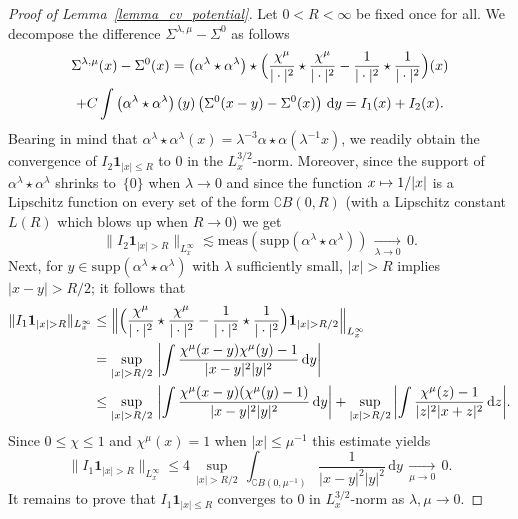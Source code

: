 \documentclass[10pt]{amsart}
\newcommand\mto{\mathchoice{\longmapsto}{\mapsto}{\mapsto}{\mapsto}}
\theoremstyle{definition}
\newenvironment{ProofOf}[1]{\begin{proof}[Proof of #1]}{\end{proof}}
\newcommand{\ud}{\, {\mathrm{d}}}
\begin{document}
\begin{ProofOf}{Lemma~\ref{lemma_cv_potential}}
Let $0<R<\infty$ be fixed once for all. We decompose the difference $\Sigma^{\lambda,\mu}-\Sigma^{0}$ as follows
\begin{multline*}
\Sigma^{\lambda,\mu}(x)-\Sigma^{0}(x)=\left(\alpha^{\lambda}\star\alpha^{\lambda}\right)\star\Bigl(\frac{\chi^{\mu}}{|\cdot|^{2}}\star\frac{\chi^{\mu}}{|\cdot|^{2}}-\frac{1}{|\cdot|^{2}}\star\frac{1}{|\cdot|^{2}}\Bigr)(x)\\
+C\int\left(\alpha^{\lambda}\star\alpha^{\lambda}\right)(y)\left(\Sigma^{0}(x-y)-\Sigma^{0}(x)\right)\ud y=I_{1}(x)+I_{2}(x).
\end{multline*}
Bearing in mind that $\alpha^{\lambda}\star\alpha^{\lambda}(x)=\lambda^{-3}\alpha\star\alpha(\lambda^{-1}x)$,
we readily obtain
the convergence of $I_{2}\mathbf{1}_{|x|\leq R}$ to 0 in the $L_{x}^{3/2}$-norm. Moreover, since the support of $\alpha^{\lambda}\star\alpha^{\lambda}$ shrinks to~$\{0\}$ when $\lambda\to 0$ and since the function $x\mto 1/|x|$ is a Lipschitz function on every set of the form $\complement B(0,R)$ (with a Lipschitz constant $L(R)$ which blows up when $R\to 0$) we get
\[
\|I_{2}\mathbf{1}_{|x|>R}\|_{L_{x}^{\infty}}\lesssim\mathrm{meas}\left(\mathrm{supp}\left(\alpha^{\lambda}\star\alpha^{\lambda}\right)\right)\,\underset{\lambda\to 0}{\to}\,0.
\]
Next, for $y\in \mathrm{supp}(\alpha^\lambda\star\alpha^\lambda)$ with $\lambda$ sufficiently small, $|x|>R$ implies $|x-y|>R/2$; it follows that
\begin{align*}
\|I_{1}\mathbf{1}_{|x|>R}\|_{L_{x}^{\infty}}
&\leq\Bigl\|\Bigl(\frac{\chi^{\mu}}{|\cdot|^{2}}\star\frac{\chi^{\mu}}{|\cdot|^{2}}-\frac{1}{|\cdot|^{2}}\star\frac{1}{|\cdot|^{2}}\Bigr)\mathbf{1}_{|x|>R/2}\Bigr\|_{L_{x}^{\infty}}\\
&=\underset{|x|>R/2}{\sup}\,\left|\int\frac{\chi^{\mu}(x-y)\chi^{\mu}(y)-1}{|x-y|^{2}|y|^{2}}\ud y\right|\\
&\leq\underset{|x|>R/2}{\sup}\,\left|\int\frac{\chi^{\mu}(x-y)(\chi^{\mu}(y)-1)}{|x-y|^{2}|y|^{2}}\ud y\right|+\underset{|x|>R/2}{\sup}\,\biggl|\int\frac{\chi^{\mu}(z)-1}{|z|^{2}|x+z|^{2}}\ud z\biggr|.
\end{align*}
Since $0\leq\chi\leq 1$ and $\chi^{\mu}(x)=1$ when $|x|\leq \mu^{-1}$ this estimate yields
\[
\|I_{1}\mathbf{1}_{|x|>R}\|_{L_{x}^{\infty}}\leq 4\,\underset{|x|>R/2}{\sup}\,\int_{\complement B(0,\mu^{-1})}\frac{1}{|x-y|^{2}|y|^{2}}\ud y\,\underset{\mu\to 0}{\to}\,0.
\]
It remains to prove that $I_{1}\mathbf{1}_{|x|\leq R}$ converges to $0$ in $L_{x}^{3/2}$-norm as $\lambda,\mu\to 0$.

\end{ProofOf}
\end{document}
